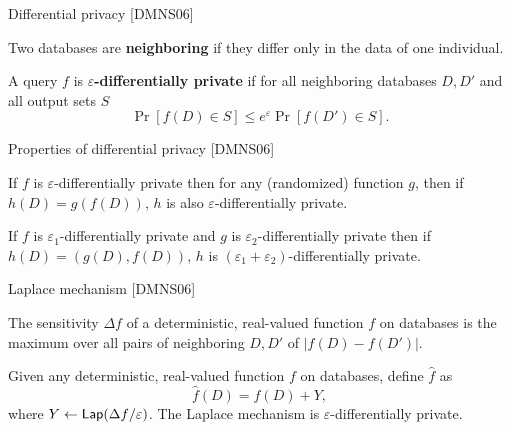 \documentclass{beamer}
\newcommand{\lap}{\ensuremath{{\sf Lap}}\xspace}
\begin{document}
\begin{frame}{Differential privacy [DMNS06]}
\pause
\begin{definition}
Two databases are \textbf{neighboring} if they differ only in the data of one individual.
\end{definition}
\pause
\begin{definition}
A query $f$ is \textbf{$\varepsilon$-differentially private} if for all neighboring databases $D, D'$ and all output sets $S$
\begin{equation*}
\Pr[f(D) \in S] \leq e^\varepsilon \Pr[f(D') \in S].
\end{equation*}
\end{definition}
\end{frame}

\begin{frame}{Properties of differential privacy [DMNS06]}
\pause
\begin{theorem}
If $f$ is $\varepsilon$-differentially private then for any (randomized) function $g$, then if $h(D) = g(f(D))$, $h$ is also $\varepsilon$-differentially private.
\end{theorem}
\pause
\begin{theorem}[Composition]
If $f$ is $\varepsilon_1$-differentially private and $g$ is $\varepsilon_2$-differentially private then if $h(D) = (g(D), f(D))$, $h$ is  $(\varepsilon_1+\varepsilon_2)$-differentially private.
\end{theorem}
\end{frame}

\begin{frame}{Laplace mechanism [DMNS06]}
\pause
\begin{definition}[Sensitivity]
The sensitivity $\Delta f$ of a deterministic, real-valued function $f$ on databases is the maximum over all pairs of neighboring $D, D'$ of $| f(D) - f(D') |$.
\end{definition}

\pause
\begin{theorem}
Given any deterministic, real-valued function $f$ on databases, define $\widehat{f}$ as
$$\widehat{f}(D) = f(D) + Y,$$
where $Y \leftarrow \lap(\Delta f/\varepsilon)$. The Laplace mechanism is $\varepsilon$-differentially private.
\end{theorem}
\end{frame}
\end{document}
